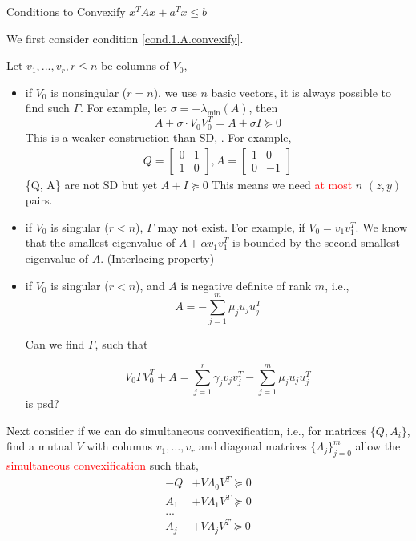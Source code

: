 \documentclass[aspectratio=1610, 9pt]{beamer}
\newcommand{\red}[1]{\textcolor{red}{#1}}
\begin{document}
\begin{frame}[allowframebreaks]{Conditions to Convexify \(x^TAx + a^Tx \le b\)}

  We first consider condition \ref{cond.1.A.convexify}.


  Let \(v_1, ..., v_r, r \le n\) be columns of \(V_0\),

  \begin{itemize}
    \item if \(V_0\) is nonsingular (\(r = n\)), we use \(n\) basic vectors, it is always possible to find such \(\Gamma\). For example, let \(\sigma = - \lambda_{\min} (A)\), then
          \[A + \sigma \cdot V_0V_0^T = A + \sigma I \succeq 0\]
          This is a weaker construction than SD, \cite{jiang_simultaneous_2016}. For example,
          \begin{align*}
            Q = \begin{bmatrix}0 & 1 \\ 1 & 0\end{bmatrix}, A = \begin{bmatrix}1 & 0 \\ 0 & -1\end{bmatrix}
          \end{align*}
          \{Q, A\} are not SD but yet \(A + I \succeq 0\)
          This means we need \red{at most} \(n\) \((z, y)\) pairs.
          \framebreak
    \item if \(V_0\) is singular (\(r < n\)), \(\Gamma\) may not exist. For example, if \(V_0 = v_1v_1^T\). We know that the smallest eigenvalue of \(A + \alpha v_1v_1^T\) is bounded by the second smallest eigenvalue of \(A\). (Interlacing property)


    \item if \(V_0\) is singular (\(r < n\)), and \(A\) is negative definite of rank \(m\), i.e.,
          \[A = - \sum_{j=1}^m \mu_j u_ju_j^T\]

          Can we find \(\Gamma\), such that

          \[V_0 \Gamma V_0^T + A = \sum_{j=1}^r \gamma_j v_jv_j^T - \sum_{j=1}^m \mu_j u_ju_j^T\]
          is psd?
  \end{itemize}

  \framebreak

  Next consider if we can do simultaneous convexification, i.e., for matrices \(\{Q, A_i\}\), find a mutual \(V\) with columns \(v_1, \dots, v_r\) and diagonal matrices \(\{\Lambda_j\}_{j=0}^m\) allow the \red{simultaneous convexification} such that,
  \begin{align*}
    - Q & +  V\Lambda_0 V^T \succeq 0 \\
    A_1 & +  V\Lambda_1 V^T \succeq 0 \\
    ...                               \\
    A_j & +  V\Lambda_j V^T \succeq 0 \\
  \end{align*}


\end{frame}
\end{document}
